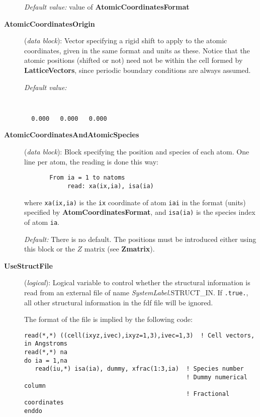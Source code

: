 \documentclass[11pt]{article}
\begin{document}
\begin{description}
{\it Default value:} value of {\bf AtomicCoordinatesFormat}


\item[{\bf AtomicCoordinatesOrigin}] ({\it data block}): 
Vector specifying a rigid shift to apply to the atomic coordinates,
given in the same format and units as these. Notice that the atomic
positions (shifted or not) need not be within the cell formed by
{\bf LatticeVectors}, since periodic boundary conditions are always
assumed.

{\it Default value:} 
{\tt
\begin{verbatim}
  0.000   0.000   0.000
\end{verbatim}
}

\item[{\bf AtomicCoordinatesAndAtomicSpecies}] ({\it data block}): 
Block specifying the position and species of each atom.
One line per atom, the reading is done this way:
\begin{verbatim}
       From ia = 1 to natoms
            read: xa(ix,ia), isa(ia)
\end{verbatim}
where {\tt xa(ix,ia)} is the {\tt ix} coordinate of atom 
{\tt iai} in the format (units) specified by
{\bf AtomCoordinatesFormat}, and {\tt isa(ia)} is the species 
index of atom {\tt ia}.

{\it Default:} There is no default. The positions must be introduced
either using this block or the $Z$ matrix (see {\bf Zmatrix}).

\item[{\bf UseStructFile}] ({\it logical}): 
Logical variable to control whether the structural information
is read from an external file of name {\it SystemLabel}.STRUCT\_IN.
If \texttt{.true.}, all other structural information in the fdf file
will be ignored. 

The format of the file is implied by the following code:

\begin{verbatim}
read(*,*) ((cell(ixyz,ivec),ixyz=1,3),ivec=1,3)  ! Cell vectors, in Angstroms
read(*,*) na
do ia = 1,na
   read(iu,*) isa(ia), dummy, xfrac(1:3,ia)  ! Species number
                                             ! Dummy numerical column
                                             ! Fractional coordinates
enddo
\end{verbatim}


\end{description}
\end{document}
